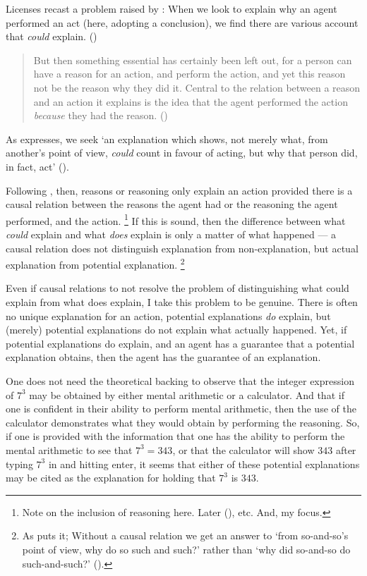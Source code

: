 \documentclass[10pt]{article}
\begin{document}
Licenses recast a problem raised by \citeauthor{Davidson:2001aa}:
When we look to explain why an agent performed an act (here, adopting a conclusion), we find there are various account that \emph{could} explain.
(\citeauthor[7--8]{Davidson:2001aa})
\begin{quote}
  But then something essential has certainly been left out, for a person can have a reason for an action, and perform the action, and yet this reason not be the reason why they did it.
  Central to the relation between a reason and an action it explains is the idea that the agent performed the action \emph{because} they had the reason.\nolinebreak
  \mbox{}\hfill\mbox{(\citeyear[9]{Davidson:2001aa})}
\end{quote}
As \citeauthor{Hieronymi:2011aa} expresses, we seek `an explanation which shows, not merely what, from another’s point of view, \emph{could} count in favour of acting, but why that person did, in fact, act' (\citeyear[417]{Hieronymi:2011aa}).

Following \citeauthor{Davidson:2001aa}, then, reasons or reasoning only explain an action provided there is a causal relation between the reasons the agent had or the reasoning the agent performed, and the action.\nolinebreak
\footnote{
  Note on the inclusion of reasoning here.
  Later \citeauthor{Davidson:2001aa} (\citeyear[232]{Davidson:2001aa}), etc.
  And, my focus.
}
If this is sound, then the difference between what \emph{could} explain and what \emph{does} explain is only a matter of what happened --- a causal relation does not distinguish explanation from non-explanation, but actual explanation from potential explanation.\nolinebreak
\footnote{
  As \citeauthor{Hieronymi:2011aa} puts it; Without a causal relation we get an answer to ‘from so-and-so’s point of view, why do so such and such?’ rather than ‘why did so-and-so do such-and-such?’ (\cite[417]{Hieronymi:2011aa}).
}

Even if causal relations to not resolve the problem of distinguishing what could explain from what does explain, I take this problem to be genuine.
There is often no unique explanation for an action, potential explanations \emph{do} explain, but (merely) potential explanations do not explain what actually happened.
Yet, if potential explanations do explain, and an agent has a guarantee that a potential explanation obtains, then the agent has the guarantee of an explanation.

One does not need the theoretical backing to observe that the integer expression of \(7^{3}\) may be obtained by either mental arithmetic or a calculator.
And that if one is confident in their ability to perform mental arithmetic, then the use of the calculator demonstrates what they would obtain by performing the reasoning.
So, if one is provided with the information that one has the ability to perform the mental arithmetic to see that \(7^{3} = 343\), or that the calculator will show \(343\) after typing \(7^{3}\) in and hitting enter, it seems that either of these potential explanations may be cited as the explanation for holding that \(7^{3}\) is \(343\).
\end{document}
